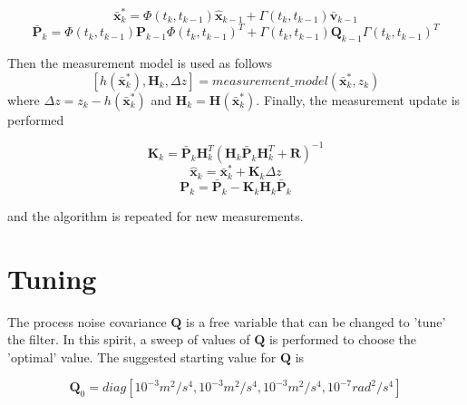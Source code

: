 \documentclass{article}
\begin{document}
\begin{equation}\label{eqn:update_dynamics_simple}
	\bar{\mathbf{x}}_k^* = \Phi(t_k,t_{k-1})\hat{\mathbf{x}}_{k-1} + \Gamma(t_k,t_{k-1})\bar{\mathbf{v}}_{k-1}
\end{equation}
\begin{equation}\label{eqn:update_covariance}
	\bar{\mathbf{P}}_k = \Phi(t_k,t_{k-1}) \mathbf{P}_{k-1} \Phi(t_k,t_{k-1})^T + \Gamma(t_k,t_{k-1}) \mathbf{Q}_{k-1} \Gamma(t_k,t_{k-1})^T
\end{equation}

Then the measurement model is used as follows
\begin{equation}\label{eqn:measurement}
	[h(\bar{\mathbf{x}}_k^*), \mathbf{H}_k, \Delta z] = measurement\_model(\bar{\mathbf{x}}_k^*, z_k)
\end{equation}
where $\Delta z = z_k - h(\bar{\mathbf{x}}_k^*)$ and $\mathbf{H}_k = \mathbf{H}(\bar{\mathbf{x}}_k^*)$. Finally, the measurement update is performed 

\begin{equation}\label{eqn:measurement_gain}
	\mathbf{K}_k = \bar{\mathbf{P}}_k \mathbf{H}_k^T(\mathbf{H}_k \bar{\mathbf{P}}_k \mathbf{H}_k^T + \mathbf{R})^{-1}
\end{equation}
\begin{equation}\label{eqn:measurement_state}
	\hat{\mathbf{x}}_k = \bar{\mathbf{x}}_k^* + \mathbf{K}_k \Delta z
\end{equation}
\begin{equation}\label{eqn:measurement_covariance}
	\mathbf{P}_k = \bar{\mathbf{P}}_k - \mathbf{K}_k \mathbf{H}_k \bar{\mathbf{P}}_k
\end{equation}

and the algorithm is repeated for new measurements. 
\section{Tuning}

The process noise covariance $\mathbf{Q}$ is a free variable that can be changed to 'tune' the filter. In this spirit, a sweep of values of $\mathbf{Q}$ is performed to choose the 'optimal' value. The suggested starting value for $\mathbf{Q}$ is 

\begin{equation}\label{eqn:Q_init}
	\mathbf{Q}_0 = diag[10^{-3} m^2/s^4, 10^{-3} m^2/s^4, 10^{-3} m^2/s^4, 10^{-7} rad^2/s^4]
\end{equation}
\end{document}
